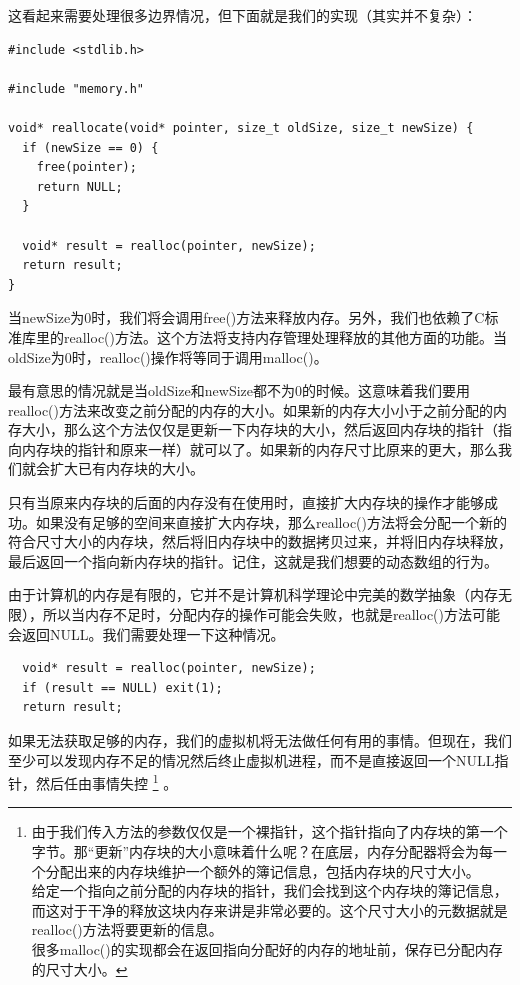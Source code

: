 \documentclass[cn,10pt,math=newtx,citestyle=gb7714-2015,bibstyle=gb7714-2015]{elegantbook}
\newenvironment{code}{\captionsetup{type=listing}}{}
\begin{document}
这看起来需要处理很多边界情况，但下面就是我们的实现（其实并不复杂）：

\begin{code}
\begin{verbatim}
#include <stdlib.h>

#include "memory.h"

void* reallocate(void* pointer, size_t oldSize, size_t newSize) {
  if (newSize == 0) {
    free(pointer);
    return NULL;
  }

  void* result = realloc(pointer, newSize);
  return result;
}
\end{verbatim}
\end{code}

当newSize为0时，我们将会调用free()方法来释放内存。另外，我们也依赖了C标准库里的realloc()方法。这个方法将支持内存管理处理释放的其他方面的功能。当oldSize为0时，realloc()操作将等同于调用malloc()。

最有意思的情况就是当oldSize和newSize都不为0的时候。这意味着我们要用realloc()方法来改变之前分配的内存的大小。如果新的内存大小小于之前分配的内存大小，那么这个方法仅仅是更新一下内存块的大小，然后返回内存块的指针（指向内存块的指针和原来一样）就可以了。如果新的内存尺寸比原来的更大，那么我们就会扩大已有内存块的大小。

只有当原来内存块的后面的内存没有在使用时，直接扩大内存块的操作才能够成功。如果没有足够的空间来直接扩大内存块，那么realloc()方法将会分配一个新的符合尺寸大小的内存块，然后将旧内存块中的数据拷贝过来，并将旧内存块释放，最后返回一个指向新内存块的指针。记住，这就是我们想要的动态数组的行为。

由于计算机的内存是有限的，它并不是计算机科学理论中完美的数学抽象（内存无限），所以当内存不足时，分配内存的操作可能会失败，也就是realloc()方法可能会返回NULL。我们需要处理一下这种情况。

\begin{code}
\begin{verbatim}
  void* result = realloc(pointer, newSize);
  if (result == NULL) exit(1);
  return result;
\end{verbatim}
\end{code}

如果无法获取足够的内存，我们的虚拟机将无法做任何有用的事情。但现在，我们至少可以发现内存不足的情况然后终止虚拟机进程，而不是直接返回一个NULL指针，然后任由事情失控 \footnote{由于我们传入方法的参数仅仅是一个裸指针，这个指针指向了内存块的第一个字节。那“更新”内存块的大小意味着什么呢？在底层，内存分配器将会为每一个分配出来的内存块维护一个额外的簿记信息，包括内存块的尺寸大小。 \\ 给定一个指向之前分配的内存块的指针，我们会找到这个内存块的簿记信息，而这对于干净的释放这块内存来讲是非常必要的。这个尺寸大小的元数据就是realloc()方法将要更新的信息。 \\ 很多malloc()的实现都会在返回指向分配好的内存的地址前，保存已分配内存的尺寸大小。} 。
\end{document}
